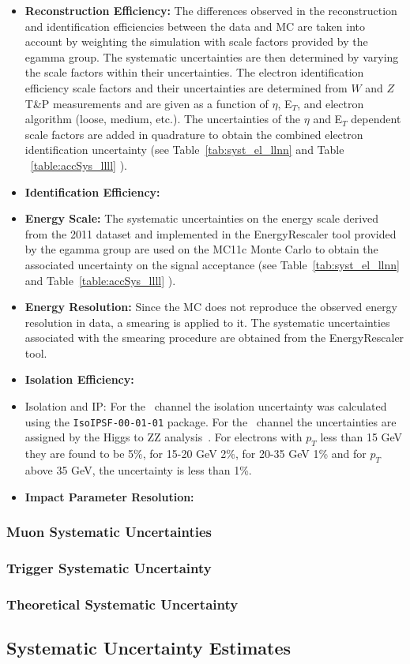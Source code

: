 \begin{itemize}
     \item {\bf Reconstruction Efficiency:}
    The differences observed in the reconstruction and identification efficiencies 
    between the data and MC are taken into account by weighting the simulation with scale factors 
    provided by the egamma group. The systematic uncertainties are then determined by varying the scale factors 
    within their uncertainties. 
    The electron identification efficiency scale factors and
    their uncertainties are determined from $W$ and $Z$ T\&P measurements and are given as a 
    function of $\eta$, E$_{T}$, and electron algorithm (loose, medium, etc.). The uncertainties of the $\eta$ and E$_{T}$ dependent scale
    factors are added in quadrature to obtain the combined electron identification
    uncertainty (see Table~\ref{tab:syst_el_llnn} and Table ~\ref{table:accSys_llll}  ).

     \item {\bf Identification Efficiency:}

     \item {\bf Energy Scale:}
    The systematic uncertainties on the energy scale derived from the 2011 dataset and implemented in the 
    EnergyRescaler tool provided by the egamma group are used on the MC11c Monte Carlo to obtain the 
    associated uncertainty on the signal acceptance (see Table~\ref{tab:syst_el_llnn} and Table~\ref{table:accSys_llll} ).

    \item {\bf Energy Resolution:}
    Since the MC does not reproduce the observed energy resolution in data, a smearing
    is applied to it. The systematic uncertainties associated with the smearing procedure are
    obtained from the EnergyRescaler tool. 

    \item {\bf Isolation Efficiency:}
     \item Isolation and IP: For the \llvv\ channel the isolation uncertainty was calculated using the \texttt{IsoIPSF-00-01-01} package. For the \llll\ channel the uncertainties are assigned by the Higgs to ZZ analysis~\cite{HZZ4l_5fb:ATL-COM-PHYS-2011-1715}. For electrons with $p_T$ less than 15 GeV they are found to be 5\%, for 15-20 GeV 2\%, for 20-35 GeV 1\%  and  for $p_T$ above 35 GeV, 
     the uncertainty is less than 1\%.

    \item {\bf Impact Parameter Resolution:}

\end{itemize}

\subsubsection{Muon Systematic Uncertainties}
\subsubsection{Trigger Systematic Uncertainty}
\subsubsection{Theoretical Systematic Uncertainty}

\subsection{Systematic Uncertainty Estimates}

